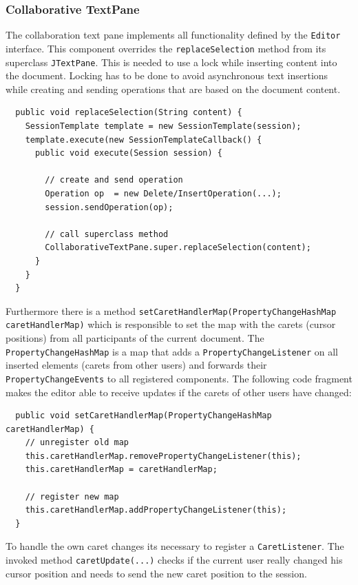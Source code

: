 \subsubsection{Collaborative TextPane}
The collaboration text pane implements all functionality defined by the \texttt{Editor} interface. This component overrides the \texttt{replaceSelection} method from its superclass \texttt{JTextPane}. This is needed to use a lock while inserting content into the document. Locking has to be done to avoid asynchronous text insertions while creating and sending operations that are based on the document content.
\begin{verbatim}
  public void replaceSelection(String content) {
    SessionTemplate template = new SessionTemplate(session);
    template.execute(new SessionTemplateCallback() {
      public void execute(Session session) {

        // create and send operation
        Operation op  = new Delete/InsertOperation(...);
        session.sendOperation(op);

        // call superclass method
        CollaborativeTextPane.super.replaceSelection(content);
      }
    }
  }
\end{verbatim}
Furthermore there is a method \texttt{setCaretHandlerMap(PropertyChangeHashMap caretHandlerMap)} which is responsible to set the map with the carets (cursor positions) from all participants of the current document. The \texttt{PropertyChangeHashMap} is a map that adds a \texttt{PropertyChangeListener} on all inserted elements (carets from other users) and forwards their \texttt{PropertyChangeEvents} to all registered components. The following code fragment makes the editor able to receive updates if the carets of other users have changed:
\begin{verbatim}
  public void setCaretHandlerMap(PropertyChangeHashMap caretHandlerMap) {
    // unregister old map
    this.caretHandlerMap.removePropertyChangeListener(this);
    this.caretHandlerMap = caretHandlerMap;

    // register new map
    this.caretHandlerMap.addPropertyChangeListener(this);
  }
\end{verbatim}
To handle the own caret changes its necessary to register a \texttt{CaretListener}. The invoked method \texttt{caretUpdate(...)} checks if the current user really changed his cursor position and needs to send the new caret position to the session.


